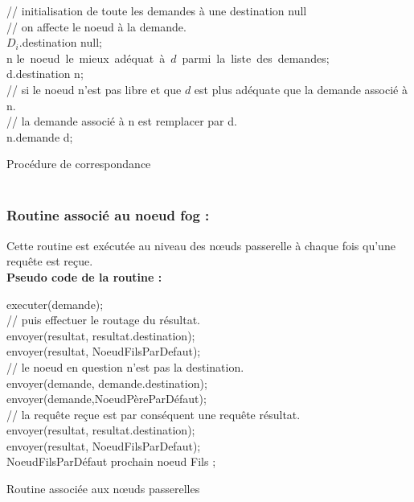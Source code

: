 \begin{algorithm}[H]
// initialisation de toute les demandes à une destination null\\
{
 // on affecte le noeud à la demande.\\
 $D_i$.destination \gets null;\\
}
{
n \gets le\ noeud\ le\ mieux\ adéquat\ à\ $d$\ parmi\ la\ liste\ des\ demandes;\\
{
  d.destination \gets n;\\
}
{
// si le noeud n’est pas libre et que $d$ est plus adéquate que la demande associé à n.\\
 {
   // la demande associé à n est remplacer par d.\\
   n.demande \gets d;\\
 }
}
}
 \caption{Procédure de correspondance\\ \\}
\end{algorithm}
\subsubsection{Routine associé au noeud fog :}
Cette routine est exécutée au niveau des nœuds passerelle à chaque fois qu’une requête est reçue.\\
\textbf{Pseudo code de la routine :}\\
\begin{algorithm}[H]
 {  
    { executer(demande);\\
     // puis effectuer le routage du résultat.\\
     {envoyer(resultat, resultat.destination);\\}
     {envoyer(resultat, NoeudFilsParDefaut);\\}
     }
    {  // le noeud en question n’est pas la destination.\\
     {envoyer(demande, demande.destination);\\}
     {envoyer(demande,NoeudPèreParDéfaut);\\}
   }
 }
 { // la requête reçue est par conséquent une requête résultat.\\
   {envoyer(resultat, resultat.destination);\\}
   {envoyer(resultat, NoeudFilsParDefaut);\\
   NoeudFilsParDéfaut \gets prochain noeud Fils ;}
 }
 \caption{Routine associée aux nœuds passerelles\\ \\}
\end{algorithm}
